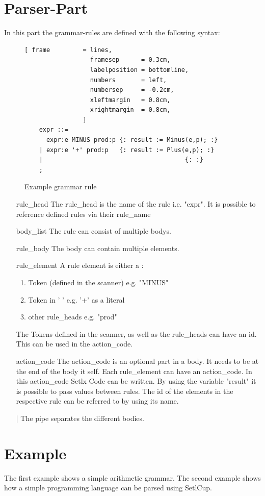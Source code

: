 \section{Parser-Part}
In this part the grammar-rules are defined with the following syntax:
\begin{figure}[!ht]
\begin{Verbatim}[ frame         = lines, 
                  framesep      = 0.3cm, 
                  labelposition = bottomline,
                  numbers       = left,
                  numbersep     = -0.2cm,
                  xleftmargin   = 0.8cm,
                  xrightmargin  = 0.8cm,
                ]
	expr ::= 
	  expr:e MINUS prod:p {: result := Minus(e,p); :} 
	| expr:e '+' prod:p   {: result := Plus(e,p); :} 
	| 										{: :}
	;
\end{Verbatim}
\caption{Example grammar rule}
\label{fig:example_grammer}
\end{figure}
\begin{itemize}
	\item[rule\_head] The rule\_head is the name of the rule i.e. "expr". It is possible to reference defined rules via their rule\_name
	\item[body\_list] The rule can consist of multiple bodys.
	\item[rule\_body] The body can contain multiple elements. 
	\item[rule\_element] A rule element is either a :
	\begin{enumerate}
		\item Token (defined in the scanner) e.g. "MINUS"
		\item Token in  ' ' e.g. '+' as a literal
		\item other rule\_heads e.g. "prod"
	\end{enumerate}
	The Tokens defined in the scanner, as well as the rule\_heads can have an id. This can be used in the action\_code.
	\item[action\_code] The action\_code is an optional part in a body. It needs to be at the end of the body it self. Each rule\_element can have an action\_code. In this action\_code Setlx Code can be written. By using the variable "result" it is possible to pass values between rules. The id of the elements in the respective rule can be referred to by using its name.
	\item[|] The pipe separates the different bodies.
\end{itemize}
\newpage
\section{Example}
The first example shows a simple arithmetic grammar.
The second example shows how a simple programming language can be parsed using SetlCup.
